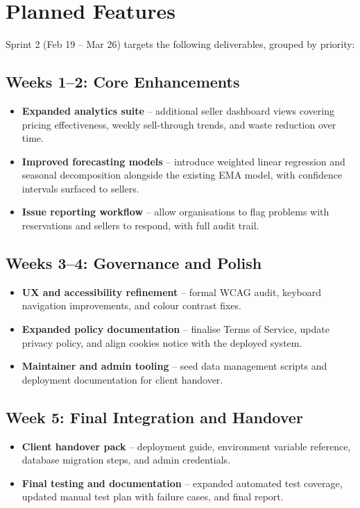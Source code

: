 \documentclass[11pt, a4paper]{report}
\begin{document}
	\section{Planned Features}
	Sprint 2 (Feb 19 -- Mar 26) targets the following deliverables, grouped by priority:

	\subsection{Weeks 1--2: Core Enhancements}
	\begin{itemize}
		\item \textbf{Expanded analytics suite} -- additional seller dashboard views covering pricing effectiveness, weekly sell-through trends, and waste reduction over time.
		\item \textbf{Improved forecasting models} -- introduce weighted linear regression and seasonal decomposition alongside the existing EMA model, with confidence intervals surfaced to sellers.
		\item \textbf{Issue reporting workflow} -- allow organisations to flag problems with reservations and sellers to respond, with full audit trail.
	\end{itemize}

	\subsection{Weeks 3--4: Governance and Polish}
	\begin{itemize}
		\item \textbf{UX and accessibility refinement} -- formal WCAG audit, keyboard navigation improvements, and colour contrast fixes.
		\item \textbf{Expanded policy documentation} -- finalise Terms of Service, update privacy policy, and align cookies notice with the deployed system.
		\item \textbf{Maintainer and admin tooling} -- seed data management scripts and deployment documentation for client handover.
	\end{itemize}

	\subsection{Week 5: Final Integration and Handover}
	\begin{itemize}
		\item \textbf{Client handover pack} -- deployment guide, environment variable reference, database migration steps, and admin credentials.
		\item \textbf{Final testing and documentation} -- expanded automated test coverage, updated manual test plan with failure cases, and final report.
	\end{itemize}

	
	
\end{document}
